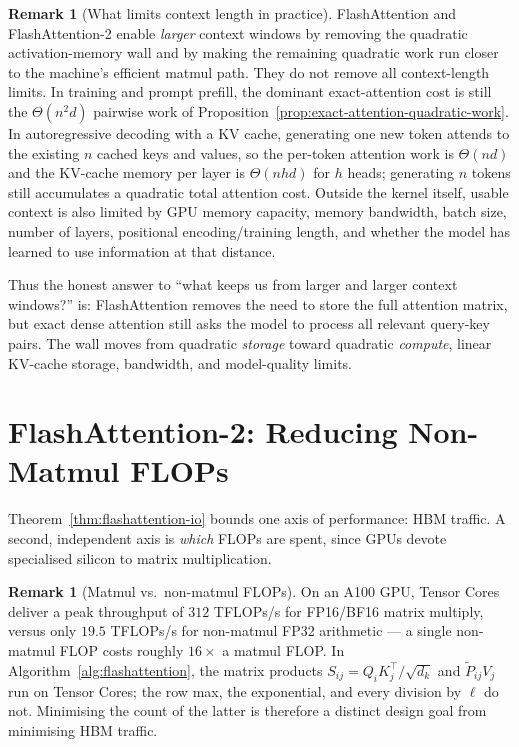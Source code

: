 \documentclass[11pt]{amsart}
\theoremstyle{plain}
\theoremstyle{definition}
\newtheorem{remark}[theorem]{Remark}
\begin{document}
\begin{remark}[What limits context length in practice]
FlashAttention and FlashAttention-2 enable \emph{larger} context windows by
removing the quadratic activation-memory wall and by making the remaining
quadratic work run closer to the machine's efficient matmul path.  They do not
remove all context-length limits.  In training and prompt prefill, the dominant
exact-attention cost is still the $\Theta(n^2d)$ pairwise work of
Proposition~\ref{prop:exact-attention-quadratic-work}.  In autoregressive
decoding with a KV cache, generating one new token attends to the existing
$n$ cached keys and values, so the per-token attention work is $\Theta(nd)$
and the KV-cache memory per layer is $\Theta(nhd)$ for $h$ heads; generating
$n$ tokens still accumulates a quadratic total attention cost.  Outside the
kernel itself, usable context is also limited by GPU memory capacity, memory
bandwidth, batch size, number of layers, positional encoding/training length,
and whether the model has learned to use information at that distance.

Thus the honest answer to ``what keeps us from larger and larger context
windows?'' is: FlashAttention removes the need to store the full attention
matrix, but exact dense attention still asks the model to process all relevant
query-key pairs.  The wall moves from quadratic \emph{storage} toward
quadratic \emph{compute}, linear KV-cache storage, bandwidth, and model-quality
limits.
\end{remark}

\section{FlashAttention-2: Reducing Non-Matmul FLOPs}
\label{sec:flash2-nonmatmul}

Theorem~\ref{thm:flashattention-io} bounds one axis of performance: HBM
traffic.  A second, independent axis is \emph{which} FLOPs are spent, since
GPUs devote specialised silicon to matrix multiplication.

\begin{remark}[Matmul vs.\ non-matmul FLOPs]
\label{rem:nonmatmul-cost}
On an A100 GPU, Tensor Cores deliver a peak throughput of $312$ TFLOPs/s for
FP16/BF16 matrix multiply, versus only $19.5$ TFLOPs/s for non-matmul FP32
arithmetic \cite{Dao2023} --- a single non-matmul FLOP costs roughly
$16\times$ a matmul FLOP.  In Algorithm~\ref{alg:flashattention}, the matrix
products $S_{ij} = Q_iK_j^\top/\sqrt{d_k}$ and $\tilde{P}_{ij}V_j$ run on
Tensor Cores; the row max, the exponential, and every division by $\ell$ do
not.  Minimising the count of the latter is therefore a distinct design goal
from minimising HBM traffic.
\end{remark}
\end{document}
